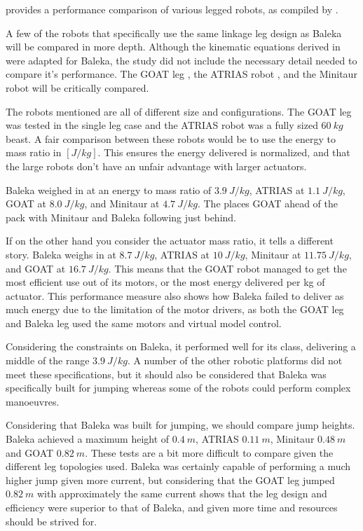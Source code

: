  provides a performance comparison of various legged robots, as compiled by \cite{Kalouche2016}.

A few of the robots that specifically use the same linkage leg design as Baleka will be compared in more depth. Although the kinematic equations derived in \cite{Duperret} were adapted for Baleka, the study did not include the necessary detail needed to compare it's performance. The GOAT leg \cite{Kalouche2016}, the ATRIAS robot \cite{jgrimes2013}, and the Minitaur robot \cite{Kenneally2016} will be critically compared.

The robots mentioned are all of different size and configurations. The GOAT leg was tested in the single leg case and the ATRIAS robot was a fully sized $60\ kg$ beast. A fair comparison between these robots would be to use the energy to mass ratio in $[J/kg]$. This ensures the energy delivered is normalized, and that the large robots don't have an unfair advantage with larger actuators.

Baleka weighed in at an energy to mass ratio of $3.9\ J/kg$, ATRIAS at $1.1\ J/kg$, GOAT at $8.0\ J/kg$, and Minitaur at $4.7\ J/kg$. The places GOAT ahead of the pack with Minitaur and Baleka following just behind. 

If on the other hand you consider the actuator mass ratio, it tells a different story. Baleka weighs in at $8.7\ J/kg$, ATRIAS at $10\ J/kg$, Minitaur at $11.75\ J/kg$, and GOAT at $16.7\ J/kg$. This means that the GOAT robot managed to get the most efficient use out of its motors, or the most energy delivered per kg of actuator. This performance measure also shows how Baleka failed to deliver as much energy due to the limitation of the motor drivers, as both the GOAT leg and Baleka leg used the same motors and virtual model control.

Considering the constraints on Baleka, it performed well for its class, delivering a middle of the range $3.9\ J/kg$. A number of the other robotic platforms did not meet these specifications, but it should also be considered that Baleka was specifically built for jumping whereas some of the robots could perform complex manoeuvres. 

Considering that Baleka was built for jumping, we should compare jump heights. Baleka achieved a maximum height of $0.4\ m$, ATRIAS $0.11\ m$, Minitaur $0.48\ m$ and GOAT $0.82\ m$. These tests are a bit more difficult to compare given the different leg topologies used. Baleka was certainly capable of performing a much higher jump given more current, but considering that the GOAT leg jumped $0.82\ m$ with approximately the same current shows that the leg design and efficiency were superior to that of Baleka, and given more time and resources should be strived for.

